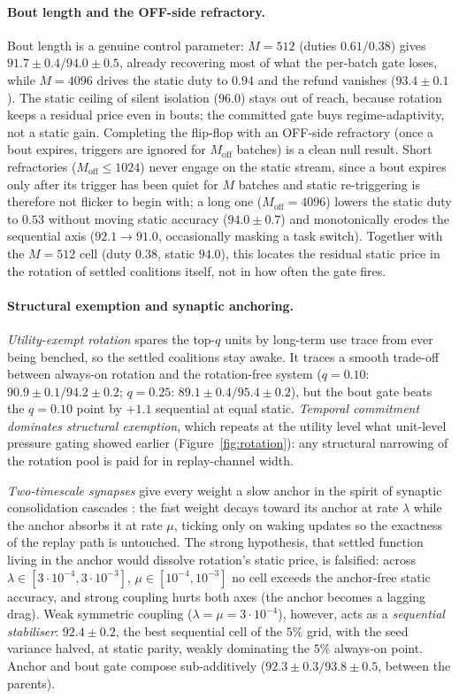 \documentclass{article}
\begin{document}
\paragraph{Bout length and the OFF-side refractory.}
Bout length is a genuine control parameter: $M{=}512$ (duties $0.61/0.38$) gives
$91.7\pm0.4/94.0\pm0.5$, already recovering most of what the per-batch gate loses, while
$M{=}4096$ drives the static duty to $0.94$ and the refund vanishes ($93.4\pm0.1$). The
static ceiling of silent isolation ($96.0$) stays out of reach, because rotation keeps a
residual price even in bouts; the committed gate buys regime-adaptivity, not a static gain.
Completing the flip-flop with an OFF-side refractory (once a bout expires, triggers are
ignored for $M_{\mathrm{off}}$ batches) is a clean null result. Short refractories
($M_{\mathrm{off}}{\le}1024$) never engage on the static stream, since a bout expires only
after its trigger has been quiet for $M$ batches and static re-triggering is therefore not
flicker to begin with; a long one ($M_{\mathrm{off}}{=}4096$) lowers the static duty to
$0.53$ without moving static accuracy ($94.0\pm0.7$) and monotonically erodes the
sequential axis ($92.1\to91.0$, occasionally masking a task switch). Together with the
$M{=}512$ cell (duty $0.38$, static $94.0$), this locates the residual static price in the
rotation of settled coalitions itself, not in how often the gate fires.

\paragraph{Structural exemption and synaptic anchoring.}
\emph{Utility-exempt rotation} spares the top-$q$ units by long-term use trace from ever
being benched, so the settled coalitions stay awake. It traces a smooth trade-off between
always-on rotation and the rotation-free system ($q{=}0.10$: $90.9\pm0.1/94.2\pm0.2$;
$q{=}0.25$: $89.1\pm0.4/95.4\pm0.2$), but the bout gate beats the $q{=}0.10$ point by $+1.1$
sequential at equal static. \emph{Temporal commitment dominates structural exemption},
which repeats at the utility level what unit-level pressure gating showed earlier
(Figure~\ref{fig:rotation}): any structural narrowing of the rotation pool is paid for in
replay-channel width.

\emph{Two-timescale synapses} give every weight a slow anchor in the spirit of synaptic
consolidation cascades \citep{benna2016}: the fast weight decays toward its anchor at rate
$\lambda$ while the anchor absorbs it at rate $\mu$, ticking only on waking updates so the
exactness of the replay path is untouched. The strong hypothesis, that settled function
living in the anchor would dissolve rotation's static price, is falsified: across
$\lambda\in[3{\cdot}10^{-4},3{\cdot}10^{-3}]$, $\mu\in[10^{-4},10^{-3}]$ no cell exceeds
the anchor-free static accuracy, and strong coupling hurts both axes (the anchor becomes a
lagging drag). Weak symmetric coupling ($\lambda{=}\mu{=}3{\cdot}10^{-4}$), however, acts as
a \emph{sequential stabiliser}: $92.4\pm0.2$, the best sequential cell of the $5\%$ grid,
with the seed variance halved, at static parity, weakly dominating the $5\%$ always-on
point. Anchor and bout gate compose sub-additively
($92.3\pm0.3/93.8\pm0.5$, between the parents).
\end{document}
